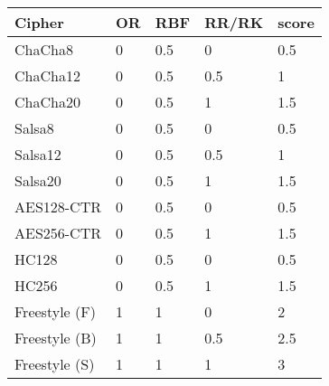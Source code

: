 \begin{table}[]
  \begin{tabular}{@{}lllll@{}}
  \toprule
  \textbf{Cipher} & \textbf{OR} & \textbf{RBF} & \textbf{RR/RK} & \textbf{score} \\ \midrule
  ChaCha8         & 0           & 0.5          & 0              & 0.5            \\
  ChaCha12        & 0           & 0.5          & 0.5            & 1              \\
  ChaCha20        & 0           & 0.5          & 1              & 1.5            \\
  Salsa8          & 0           & 0.5          & 0              & 0.5            \\
  Salsa12         & 0           & 0.5          & 0.5            & 1              \\
  Salsa20         & 0           & 0.5          & 1              & 1.5            \\
  AES128-CTR      & 0           & 0.5          & 0              & 0.5            \\
  AES256-CTR      & 0           & 0.5          & 1              & 1.5            \\
  HC128           & 0           & 0.5          & 0              & 0.5            \\
  HC256           & 0           & 0.5          & 1              & 1.5            \\
  Freestyle (F)   & 1           & 1            & 0              & 2              \\
  Freestyle (B)   & 1           & 1            & 0.5            & 2.5            \\
  Freestyle (S)   & 1           & 1            & 1              & 3
  \end{tabular}
  \caption{}
  \label{tbl:security-quant}
\end{table}
